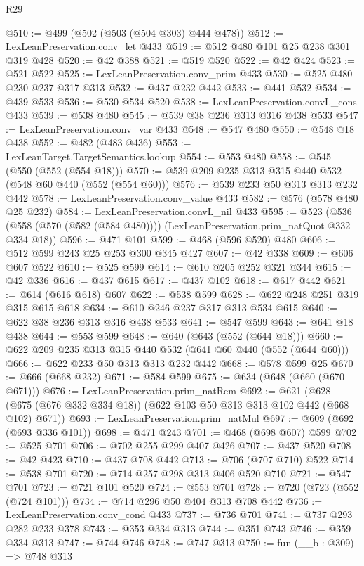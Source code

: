 \begin{lexlean}{R29}
\begin{coremodule}
@510 := @499 (@502 (@503 (@504 @303) @444 @478))
@512 := LexLeanPreservation.conv_let @433
@519 := @512 @480 @101 @25 @238 @301 @319 @428
@520 := @42 @388
@521 := @519 @520
@522 := @42 @424
@523 := @521 @522
@525 := LexLeanPreservation.conv_prim @433
@530 := @525 @480 @230 @237 @317 @313
@532 := @437 @232 @442
@533 := @441 @532
@534 := @439 @533
@536 := @530 @534 @520
@538 := LexLeanPreservation.convL_cons @433
@539 := @538 @480
@545 := @539 @38 @236 @313 @316 @438 @533
@547 := LexLeanPreservation.conv_var @433
@548 := @547 @480
@550 := @548 @18 @438
@552 := @482 (@483 @436)
@553 := LexLeanTarget.TargetSemantics.lookup
@554 := @553 @480
@558 := @545 (@550 (@552 (@554 @18)))
@570 := @539 @209 @235 @313 @315 @440 @532 (@548 @60 @440 (@552 (@554 @60)))
@576 := @539 @233 @50 @313 @313 @232 @442
@578 := LexLeanPreservation.conv_value @433
@582 := @576 (@578 @480 @25 @232)
@584 := LexLeanPreservation.convL_nil @433
@595 := @523
    (@536 (@558 (@570 (@582 (@584 @480)))) (LexLeanPreservation.prim_natQuot @332 @334 @18))
@596 := @471 @101
@599 := @468 (@596 @520) @480
@606 := @512 @599 @243 @25 @253 @300 @345 @427
@607 := @42 @338
@609 := @606 @607 @522
@610 := @525 @599
@614 := @610 @205 @252 @321 @344
@615 := @42 @336
@616 := @437 @615
@617 := @437 @102
@618 := @617 @442
@621 := @614 (@616 @618) @607
@622 := @538 @599
@628 := @622 @248 @251 @319 @315 @615 @618
@634 := @610 @246 @237 @317 @313 @534 @615
@640 := @622 @38 @236 @313 @316 @438 @533
@641 := @547 @599
@643 := @641 @18 @438
@644 := @553 @599
@648 := @640 (@643 (@552 (@644 @18)))
@660 := @622 @209 @235 @313 @315 @440 @532 (@641 @60 @440 (@552 (@644 @60)))
@666 := @622 @233 @50 @313 @313 @232 @442
@668 := @578 @599 @25
@670 := @666 (@668 @232)
@671 := @584 @599
@675 := @634 (@648 (@660 (@670 @671)))
@676 := LexLeanPreservation.prim_natRem
@692 := @621 (@628 (@675 (@676 @332 @334 @18)) (@622 @103 @50 @313 @313 @102 @442 (@668 @102) @671))
@693 := LexLeanPreservation.prim_natMul
@697 := @609 (@692 (@693 @336 @101))
@698 := @471 @243
@701 := @468 (@698 @607) @599
@702 := @525 @701
@706 := @702 @255 @299 @407 @426
@707 := @437 @520
@708 := @42 @423
@710 := @437 @708 @442
@713 := @706 (@707 @710) @522
@714 := @538 @701
@720 := @714 @257 @298 @313 @406 @520 @710
@721 := @547 @701
@723 := @721 @101 @520
@724 := @553 @701
@728 := @720 (@723 (@552 (@724 @101)))
@734 := @714 @296 @50 @404 @313 @708 @442
@736 := LexLeanPreservation.conv_cond @433
@737 := @736 @701
@741 := @737 @293 @282 @233 @378
@743 := @353 @334 @313
@744 := @351 @743
@746 := @359 @334 @313
@747 := @744 @746
@748 := @747 @313
@750 := fun (__b : @309) => @748 @313

\end{coremodule}
\end{lexlean}
